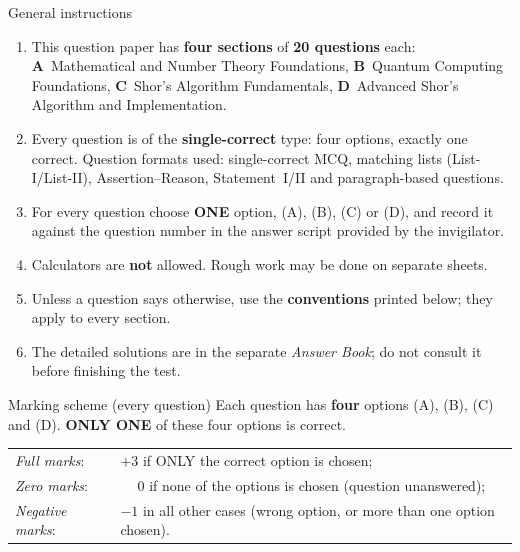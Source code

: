 \documentclass[11pt,a4paper]{article}
\begin{document}
\vspace{6pt}
\begin{infobox}{General instructions}
\begin{enumerate}[leftmargin=1.4em, itemsep=1pt, topsep=1pt]
\item This question paper has \textbf{four sections} of \textbf{20 questions} each:
\textbf{A}~Mathematical and Number Theory Foundations, \textbf{B}~Quantum Computing Foundations, \textbf{C}~Shor's Algorithm Fundamentals, \textbf{D}~Advanced Shor's Algorithm and Implementation.
\item Every question is of the \textbf{single-correct} type: four options, exactly one correct. Question formats used:
single-correct MCQ, matching lists (List-I/List-II), Assertion--Reason, Statement~I/II and paragraph-based questions.
\item For every question choose \textbf{ONE} option, (A), (B), (C) or (D), and record it against the question number in the answer script provided by the invigilator.
\item Calculators are \textbf{not} allowed. Rough work may be done on separate sheets.
\item Unless a question says otherwise, use the \textbf{conventions} printed below; they apply to every section.
\item The detailed solutions are in the separate \emph{Answer Book}; do not consult it before finishing the test.
\end{enumerate}
\end{infobox}
\begin{infobox}{Marking scheme (every question)}
Each question has \textbf{four} options (A), (B), (C) and (D). \textbf{ONLY ONE} of these four options is correct.\\[2pt]
\begin{tabular}{@{}ll@{}}
\emph{Full marks}: & $+3$ if ONLY the correct option is chosen;\\
\emph{Zero marks}: & $\phantom{+}0$ if none of the options is chosen (question unanswered);\\
\emph{Negative marks}: & $-1$ in all other cases (wrong option, or more than one option chosen).
\end{tabular}
\end{infobox}
\end{document}
